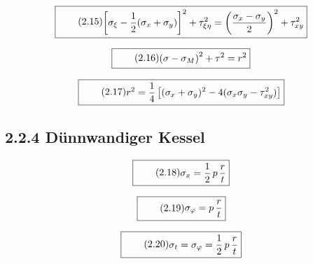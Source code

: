 \documentclass[11pt]{article}
\newcommand{\1}{ {\mathds{1}} }
\begin{document}
    \begin{equation}
      \boxed{
        \tag{2.15}
        \begin{split}
          \left[\sigma_\xi - \frac{1}{2} (\sigma_x + \sigma_y)\right]^2
          +
          \tau_{\xi \eta}^2
          =
          \left(
            \frac{\sigma_x - \sigma_y}{2}
          \right)^2
          +
          \tau_{xy}^2
        \end{split}
      }
    \end{equation}    

    \begin{equation}
      \boxed{
        \tag{2.16}
        \begin{split}
          \left(\sigma - \sigma_M\right)^2
          +
          \tau^2
          =
          r^2
        \end{split}
      }
    \end{equation}    

    \begin{equation}
      \boxed{
        \tag{2.17}
        \begin{split}
          r^2
          =
          \frac{1}{4}
          \left[
            (\sigma_x + \sigma_y)^2
            -
            4 (\sigma_x\sigma_y -\tau_{xy}^2)
          \right]
        \end{split}
      }
    \end{equation}    

    \subsection*{2.2.4 Dünnwandiger Kessel}

    \begin{equation}
      \boxed{
        \tag{2.18}
        \begin{split}
          \sigma_x
          =
          \frac{1}{2} \,p\, \frac{r}{t}
        \end{split}
      }
    \end{equation}

    \begin{equation}
      \boxed{
        \tag{2.19}
        \begin{split}
          \sigma_{\varphi}
          =
          p\,
          \frac{r}{t}
        \end{split}
      }
    \end{equation}

    \begin{equation}
      \boxed{
        \tag{2.20}
        \begin{split}
          \sigma_t
          =
          \sigma_\varphi
          =
          \frac{1}{2}\,p\,\frac{r}{t}
        \end{split}
      }
    \end{equation}
\end{document}
